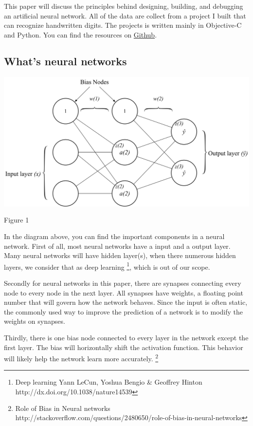 \documentclass[]{article}
\begin{document}
\begin{multicols}{2}
This paper will discuss the principles behind designing, building, and
debugging an artificial neural network. All of the data are collect from a project I built that can recognize handwritten digits. The projects is written mainly in Objective-C and Python. You can find the resources on
\href{https://github.com/NeilNie/Neural-Network-Research}{Github}.

\subsection{What's neural networks}

\centerline{\includegraphics[width=1\linewidth]{nn} }
\centerline{Figure 1}
\vspace{0.5cm}

In the diagram above, you can find the important components in a neural network. First of all, most neural networks have a input and a output layer. Many neural networks will have hidden layer(s), when there numerous hidden layers, we consider that as deep learning \footnote{Deep learning Yann LeCun,	Yoshua Bengio \& Geoffrey Hinton http://dx.doi.org/10.1038/nature14539}, which is out of our scope. 

Secondly for neural networks in this paper, there are synapses connecting every node to every node in the next layer. All synapses have weights, a floating point number that will govern how the network behaves. Since the input is often static, the commonly used way to improve the prediction of a network is to modify the weights on synapses. 

Thirdly, there is one bias node connected to every layer in the network except the first layer. The bias will horizontally shift the activation function. This behavior will likely help the network learn more accurately. \footnote{Role of Bias in Neural  networks http://stackoverflow.com/questions/2480650/role-of-bias-in-neural-networks}


\end{multicols}
\end{document}
